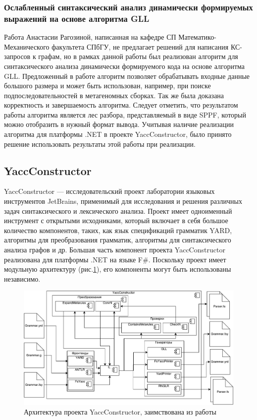 \documentclass[14pt]{matmex-diploma-custom}
\begin{document}
		\subsubsection*{Ослабленный синтаксический анализ динамически формируемых выражений на основе алгоритма GLL}
		Работа Анастасии Рагозиной, написанная на кафедре СП Математико-Механического факультета СПбГУ, не предлагает решений для написания КС-запросов к графам, но в рамках данной работы был реализован алгоритм для синтаксического анализа динамически формируемого кода на основе алгоритма GLL. Предложенный в работе алгоритм позволяет обрабатывать входные данные большого размера и может быть использован, например, при поиске подпоследовательностей в метагеномных сборках. Так же была доказана корректность и завершаемость алгоритма. Следует отметить, что результатом работы алгоритма является лес разбора, представляемый в виде SPPF\cite{SPPF}, который можно отобразить в нужный формат вывода. Учитывая наличие реализации алгоритма для платформы .NET в проекте YaccConstructor, было принято решение использовать результаты этой работы при реализации.
	\subsection{YaccConstructor}
	    YaccConstructor --- исследовательский проект лаборатории языковых инструментов JetBrains, применимый для исследования и решения различных задач синтаксического и лексического анализа. Проект имеет одноименный инструмент с открытыми исходниками, который включает в себя большое количество компонентов, таких, как язык спецификаций грамматик YARD, алгоритмы для преобразования грамматик, алгоритмы для синтаксического анализа графов и др. Большая часть компонент проекта YaccConstructor реализована для платформы .NET на языке F\#. Поскольку проект имеет модульную архитектуру (рис.\ref{arch}), его компоненты могут быть использованы независимо.
	    
        \begin{figure}
            \centering
            \includegraphics[width=\textwidth]{pics/YCArch.pdf}
            \caption{Архитектура проекта YaccConstructor, заимствована из работы \cite{gsv_phd} \label{arch}}
        \end{figure}
	    
\end{document}
